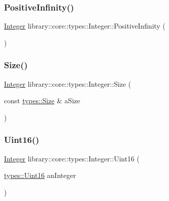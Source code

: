 \subsubsection{\texorpdfstring{Positive\+Infinity()}{PositiveInfinity()}}
{\footnotesize\ttfamily \hyperlink{classlibrary_1_1core_1_1types_1_1_integer}{Integer} library\+::core\+::types\+::\+Integer\+::\+Positive\+Infinity (\begin{DoxyParamCaption}{ }\end{DoxyParamCaption})\hspace{0.3cm}{\ttfamily [static]}}

\mbox{\label{classlibrary_1_1core_1_1types_1_1_integer_a42a312defba217d122aa51b9cb46940c}} 
\subsubsection{\texorpdfstring{Size()}{Size()}}
{\footnotesize\ttfamily \hyperlink{classlibrary_1_1core_1_1types_1_1_integer}{Integer} library\+::core\+::types\+::\+Integer\+::\+Size (\begin{DoxyParamCaption}\item[{const \hyperlink{namespacelibrary_1_1core_1_1types_a701626ea1027888ebbb8cfd0ff7adab0}{types\+::\+Size} \&}]{a\+Size }\end{DoxyParamCaption})\hspace{0.3cm}{\ttfamily [static]}}

\mbox{\label{classlibrary_1_1core_1_1types_1_1_integer_a53066966128ecd2baf683522f94ccea5}} 
\subsubsection{\texorpdfstring{Uint16()}{Uint16()}}
{\footnotesize\ttfamily \hyperlink{classlibrary_1_1core_1_1types_1_1_integer}{Integer} library\+::core\+::types\+::\+Integer\+::\+Uint16 (\begin{DoxyParamCaption}\item[{\hyperlink{namespacelibrary_1_1core_1_1types_a058aff3dd2661e18ff83255059561123}{types\+::\+Uint16}}]{an\+Integer }\end{DoxyParamCaption})\hspace{0.3cm}{\ttfamily [static]}}

